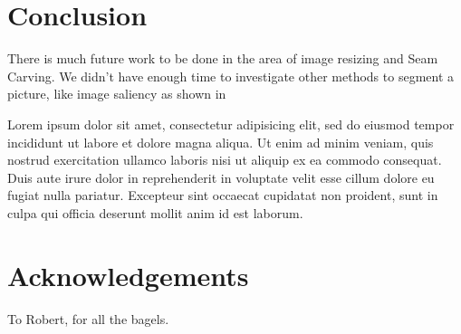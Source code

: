 \documentclass[conference]{acmsiggraph}
\begin{document}
\section{Conclusion}

There is much future work to be done in the area of image resizing and Seam Carving. We didn't have enough time to investigate other methods to segment a picture, like image saliency as shown in  

Lorem ipsum dolor sit amet, consectetur adipisicing elit, sed do
eiusmod tempor incididunt ut labore et dolore magna aliqua. Ut enim ad
minim veniam, quis nostrud exercitation ullamco laboris nisi ut
aliquip ex ea commodo consequat. Duis aute irure dolor in
reprehenderit in voluptate velit esse cillum dolore eu fugiat nulla
pariatur. Excepteur sint occaecat cupidatat non proident, sunt in
culpa qui officia deserunt mollit anim id est laborum.

\section*{Acknowledgements}

To Robert, for all the bagels.



\end{document}
